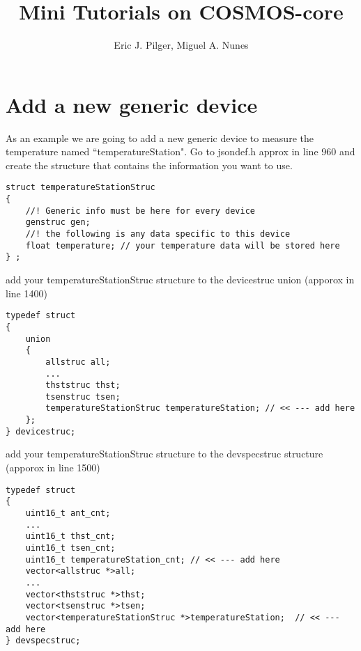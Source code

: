 

\title{Mini Tutorials on COSMOS-core}
\author{Eric J. Pilger, Miguel A. Nunes}



\maketitle
\tableofcontents



\newpage
\section{Add a new generic device}

As an example we are going to add a new generic device to measure the temperature named ``temperatureStation". Go to jsondef.h approx in line 960 and create the structure that  contains the information you want to use.

\begin{lstlisting}
struct temperatureStationStruc
{
	//! Generic info must be here for every device
	genstruc gen;
	//! the following is any data specific to this device
	float temperature; // your temperature data will be stored here
} ;

\end{lstlisting}

add your temperatureStationStruc structure to the devicestruc union (apporox in line 1400)

\begin{lstlisting}
typedef struct
{
	union
	{
		allstruc all;
		...
		thststruc thst;
		tsenstruc tsen;
		temperatureStationStruc temperatureStation; // << --- add here
	};
} devicestruc;

\end{lstlisting}


add your temperatureStationStruc structure to the devspecstruc structure (apporox in line 1500)


\begin{lstlisting}
typedef struct
{
	uint16_t ant_cnt;
	...
	uint16_t thst_cnt;
	uint16_t tsen_cnt; 
	uint16_t temperatureStation_cnt; // << --- add here
	vector<allstruc *>all;
	...
	vector<thststruc *>thst;
	vector<tsenstruc *>tsen;
	vector<temperatureStationStruc *>temperatureStation;  // << --- add here
} devspecstruc;

\end{lstlisting}


